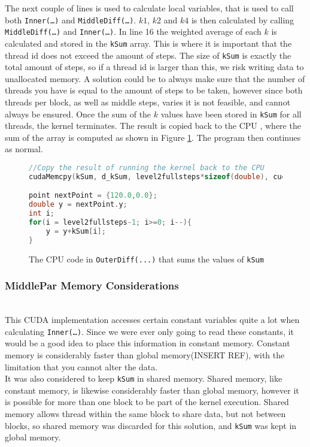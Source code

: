 The next couple of lines is used to calculate local variables, that is used to call both \texttt{Inner(…)} and \texttt{MiddleDiff(…)}. $k1$, $k2$ and $k4$ is then calculated by calling \texttt{MiddleDiff(…)} and \texttt{Inner(…)}. In line 16 the weighted average of each $k$ is calculated and stored in the \texttt{kSum} array. This is where it is important that the thread id does not exceed the amount of steps. The size of \texttt{kSum} is exactly the total amount of steps, so if a thread id is larger than this, we risk writing data to unallocated memory. A solution could be to always make sure that the number of threads you have is equal to the amount of steps to be taken, however since both threads per block, as well as middle steps, varies it is not feasible, and cannot always be ensured. Once the sum of the $k$ values have been stored in \texttt{kSum} for all threads, the kernel terminates. The result is copied back to the CPU , where the sum of the array is computed as shown in Figure \ref{fig:middleparcpu}. The program then continues as normal.

\begin{figure}[H]
\begin{lstlisting}[language=c]
//Copy the result of running the kernel back to the CPU
cudaMemcpy(kSum, d_kSum, level2fullsteps*sizeof(double), cudaMemcpyDeviceToHost);

point nextPoint = {120.0,0.0};
double y = nextPoint.y;
int i;
for(i = level2fullsteps-1; i>=0; i--){
	y = y+kSum[i];
}
\end{lstlisting}
\caption{The CPU code in \texttt{OuterDiff(...)} that sums the values of \texttt{kSum}}
\label{fig:middleparcpu}
\end{figure}

\subsubsection{MiddlePar Memory Considerations} \hfill \\
This CUDA implementation accesses certain constant variables quite a lot when calculating \texttt{Inner(…)}. Since we were ever only going to read these constants, it would be a good idea to place this information in constant memory. Constant memory is considerably faster than global memory(INSERT REF), with the limitation that you cannot alter the data.\\

It was also considered to keep \texttt{kSum} in shared memory. Shared memory, like constant memory, is likewise considerably faster than global memory, however it is possible for more than one block to be part of the kernel execution. Shared memory allows thread within the same block to share data, but not between blocks, so shared memory was discarded for this solution, and \texttt{kSum} was kept in global memory.

